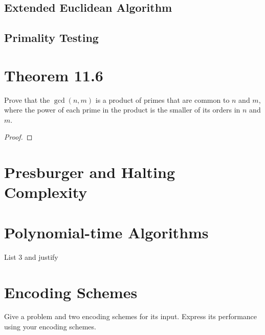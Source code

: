 \documentclass{article}
\renewcommand{\_}{\ifincsname_\else\legacyunderscore\fi}
\begin{document}
    \subsection*{Extended Euclidean Algorithm}

    \subsection*{Primality Testing}

\section*{Theorem 11.6}

    Prove that the $\gcd(n, m)$ is a product of primes that are common to $n$ and $m$, where the power of each prime in the product is the smaller of its orders in $n$ and $m$.

    \begin{proof}
        
    \end{proof}

\section*{Presburger and Halting Complexity}

\section*{Polynomial-time Algorithms}

    List 3 and justify

\section*{Encoding Schemes}

    Give a problem and two encoding schemes for its input.  Express its performance using your encoding schemes.
\end{document}
